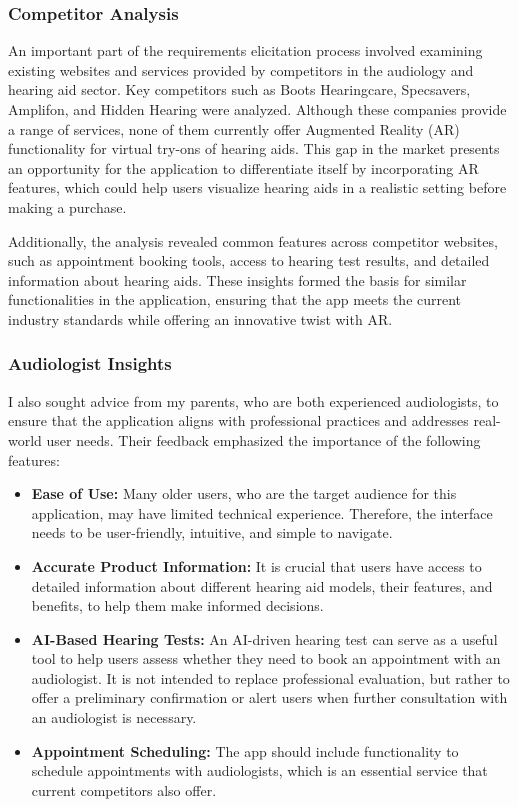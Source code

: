 \documentclass{article}
\begin{document}
\subsubsection{Competitor Analysis} An important part of the requirements elicitation process involved examining existing websites and services provided by competitors in the audiology and hearing aid sector. Key competitors such as Boots Hearingcare, Specsavers, Amplifon, and Hidden Hearing were analyzed. Although these companies provide a range of services, none of them currently offer Augmented Reality (AR) functionality for virtual try-ons of hearing aids. This gap in the market presents an opportunity for the application to differentiate itself by incorporating AR features, which could help users visualize hearing aids in a realistic setting before making a purchase.

Additionally, the analysis revealed common features across competitor websites, such as appointment booking tools, access to hearing test results, and detailed information about hearing aids. These insights formed the basis for similar functionalities in the application, ensuring that the app meets the current industry standards while offering an innovative twist with AR.

\subsubsection{Audiologist Insights} I also sought advice from my parents, who are both experienced audiologists, to ensure that the application aligns with professional practices and addresses real-world user needs. Their feedback emphasized the importance of the following features: 
\begin{itemize} 
    \item \textbf{Ease of Use:} Many older users, who are the target audience for this application, may have limited technical experience. Therefore, the interface needs to be user-friendly, intuitive, and simple to navigate. 
    \item \textbf{Accurate Product Information:} It is crucial that users have access to detailed information about different hearing aid models, their features, and benefits, to help them make informed decisions. 
    \item \textbf{AI-Based Hearing Tests:} An AI-driven hearing test can serve as a useful tool to help users assess whether they need to book an appointment with an audiologist. It is not intended to replace professional evaluation, but rather to offer a preliminary confirmation or alert users when further consultation with an audiologist is necessary.
    \item \textbf{Appointment Scheduling:} The app should include functionality to schedule appointments with audiologists, which is an essential service that current competitors also offer. 
\end{itemize}
\end{document}
